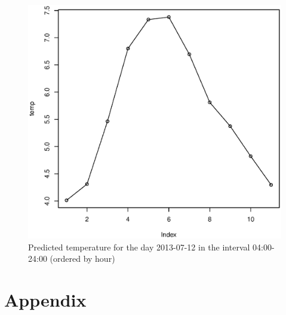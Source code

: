 \documentclass[a4paper, 12pt]{article}
\begin{document}
    \begin{figure}[H]
    \centering
    \caption{Predicted temperature for the day 2013-07-12 in the interval 04:00-24:00 (ordered by hour)\label{fig:bad_result}}
	    \begin{minipage}[]{0.4\textwidth}
	    	\includegraphics[width=\textwidth]{share/bad_result.eps}
	    \end{minipage}
    \end{figure}


    \nocite{*} %
    
    
    \onecolumn \appendix
    \section*{Appendix}
 	


    
\end{document}
